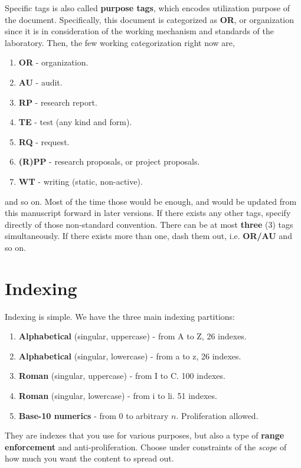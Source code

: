 \documentclass[9pt,a4paper]{article}
\begin{document}
Specific tags is also called \textbf{purpose tags}, which encodes utilization purpose of the document. Specifically, this document is categorized as \textbf{OR}, or organization since it is in consideration of the working mechanism and standards of the laboratory. Then, the few working categorization right now are,
\begin{enumerate}
    \item \textbf{OR} - organization. 
    \item \textbf{AU} - audit. 
    \item \textbf{RP} - research report. 
    \item \textbf{TE} - test (any kind and form). 
    \item \textbf{RQ} - request. 
    \item \textbf{(R)PP} - research proposals, or project proposals. 
    \item \textbf{WT} - writing (static, non-active). 
\end{enumerate}
and so on. Most of the time those would be enough, and would be updated from this manuscript forward in later versions. If there exists any other tags, specify directly of those non-standard convention. There can be at most \textbf{three} (3) tags simultaneously. If there exists more than one, dash them out, i.e. \textbf{OR/AU} and so on. 
\section{Indexing}

Indexing is simple. We have the three main indexing partitions:
\begin{enumerate}
    \item \textbf{Alphabetical} (singular, uppercase) - from A to Z, 26 indexes. 
    \item \textbf{Alphabetical} (singular, lowercase) - from a to z, 26 indexes.
    \item \textbf{Roman} (singular, uppercase) - from I to C. 100 indexes. 
    \item \textbf{Roman} (singular, lowercase) - from i to li. 51 indexes. 
    \item \textbf{Base-10 numerics} - from 0 to arbitrary $n$. Proliferation allowed. 
\end{enumerate}

They are indexes that you use for various purposes, but also a type of \textbf{range enforcement} and anti-proliferation. Choose under constraints of the \textit{scope} of how much you want the content to spread out. 
\end{document}
